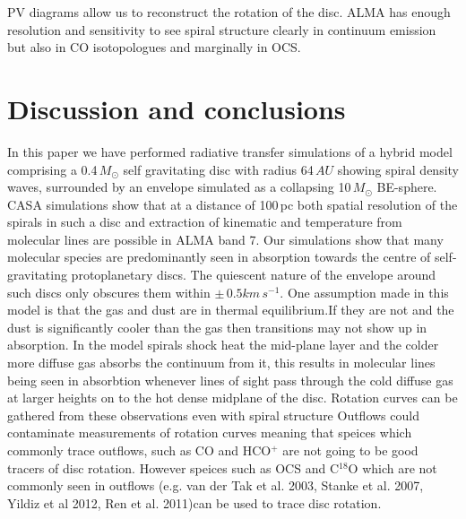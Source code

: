 \documentclass[useAMS,usenatbib]{mn2e}
\begin{document}
%

PV diagrams allow us to reconstruct the rotation of the disc. ALMA has enough resolution and sensitivity to see spiral structure clearly in continuum emission but also in CO isotopologues and marginally in OCS.


\section{Discussion and conclusions} \label{sec:discussion}

In this paper we have performed radiative transfer simulations of a hybrid model comprising a 0.4$\, M_\odot$ self gravitating disc with radius 64$\,AU$ showing spiral density waves, surrounded by an envelope simulated as a collapsing 10$\,M_\odot$ BE-sphere. CASA simulations show that at a distance of 100$\,$pc both spatial resolution of the spirals in such a disc and extraction of kinematic and temperature from molecular lines are possible in ALMA band 7. Our simulations show that many  molecular species are predominantly seen in absorption towards the centre of  self-gravitating protoplanetary discs. The quiescent nature of the envelope around such discs only obscures them within $\pm\,0.5 km\,s^{-1}$.\newline
One assumption made in this model is that the gas and dust are in thermal equilibrium.If they are not and the dust is significantly cooler than the gas then transitions may not show up in absorption.\newline
In the model spirals shock heat the mid-plane layer and the colder more diffuse gas absorbs the continuum from it, this results in molecular lines being seen in absorbtion whenever lines of sight pass through the cold diffuse gas at larger heights on to the hot dense midplane of the disc. Rotation curves can be gathered from these observations even with spiral structure\newline
Outflows could contaminate measurements of rotation curves meaning that speices  which commonly trace outflows, such as CO and HCO$^+$ are not going to be good tracers of disc rotation. However speices such as OCS and C$^{18}$O which are not commonly seen in outflows (e.g. van der Tak et al. 2003, Stanke et al. 2007, Yildiz et al 2012, Ren et al. 2011)can be used to trace disc rotation.
\end{document}
